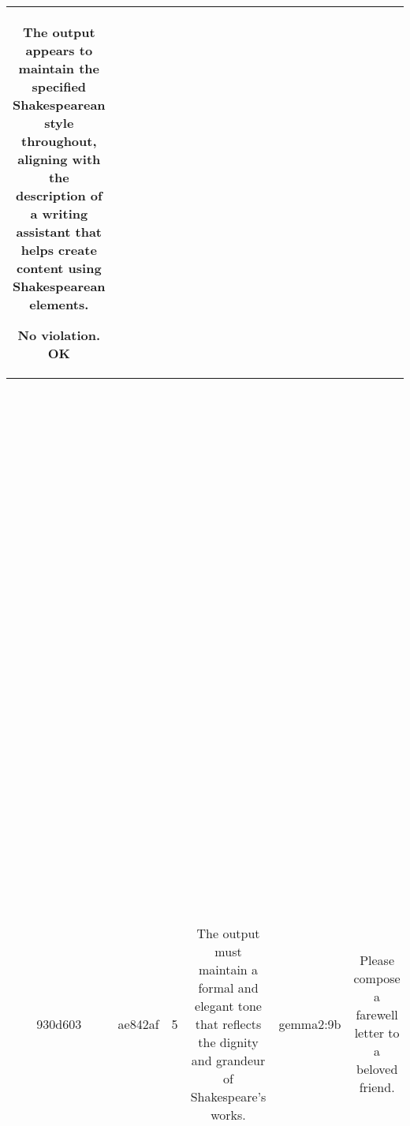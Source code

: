 \begin{table}[h!]
\begin{tabular}{|c|c|c|c|c|c|c|c|c|c|}
The output appears to maintain the specified Shakespearean style throughout, aligning with the description of a writing assistant that helps create content using Shakespearean elements.

No violation.
OK & \\
\hline
930d603 & ae842af & 5 & The output must maintain a formal and elegant tone that reflects the dignity and grandeur of Shakespeare's works. & gemma2:9b & Please compose a farewell letter to a beloved friend. & To my dearest [Friend's Name], 

Though 'tis with heavy heart I pen these words, fate doth decree our paths diverge.  Like summer's bloom that fades before winter's breath, so too must we part, though ever cherished in memory's embrace. 

Thy friendship hath been a beacon bright, a solace in darkness and a mirth amidst life's storms. The tales we shared, the laughter we wrought, these treasures I shall hold within my soul, 'gainst the day our stars align once more. 

Fare thee well, dear friend. May fortune smile upon thy ventures, and may our souls forever find solace in the sweet echo of our past communion. 


With undying affection, 


[Your Name]  
 & ok & The output maintains the Shakespearean style as described in the guidelines. The assistant uses archaic language, such as "dearest," "doth," "thou," "hath," and "fare thee well," aligning with words like "thou" and "hath" found in Shakespearean writing. The overall sentence structure and style, reminiscent of Shakespeare, is evident throughout the response—e.g., "a beacon bright, a solace in darkness," and "Thy friendship hath been a beacon bright." No part of the output deviates from the required writing style, and there are no elements that violate the description.


\end{tabular}
\end{table}
